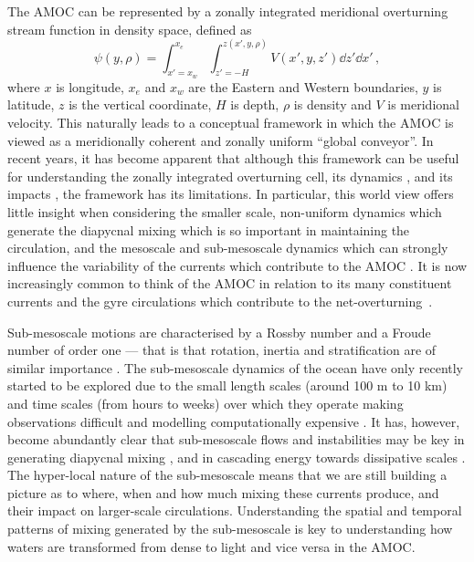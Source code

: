 The AMOC can be represented by a zonally integrated meridional overturning stream function in density space, defined as
\begin{equation}
    \psi(y, \rho) = \int_{x' = x_w}^{x_e} \int_{z' = -H}^{z(x', y, \rho)} V(x', y, z') \dd{z'} \dd{x'} \, ,
\end{equation}
where $x$ is longitude, $x_e$ and $x_w$ are the Eastern and Western boundaries, $y$ is latitude, $z$ is the vertical coordinate, $H$ is depth, $\rho$ is density and $V$ is meridional velocity. This naturally leads to a conceptual framework in which the AMOC is viewed as a meridionally coherent and zonally uniform ``global conveyor''. In recent years, it has become apparent that although this framework can be useful for understanding the zonally integrated overturning cell, its dynamics \citep{Weijer2019}, and its impacts \citep{Zhang2019, Little2019}, the framework has its limitations. In particular, this world view offers little insight when considering the smaller scale, non-uniform dynamics which generate the diapycnal mixing which is so important in maintaining the circulation, and the mesoscale and sub-mesoscale dynamics which can strongly influence the variability of the currents which contribute to the AMOC \citep[e.g.][]{Thomas2013}. It is now increasingly common to think of the AMOC in relation to its many constituent currents and the gyre circulations which contribute to the net-overturning~\citep{Bower2019}.

Sub-mesoscale motions are characterised by a Rossby number and a Froude number of order one --- that is that rotation, inertia and stratification are of similar importance \citep{Gula2022, McWilliams2016, Thomas2008}. The sub-mesoscale dynamics of the ocean have only recently started to be explored due to the small length scales (around 100 m to 10 km) and time scales (from hours to weeks) over which they operate making observations difficult and modelling computationally expensive \citep{Thomas2008}. It has, however, become abundantly clear that sub-mesoscale flows and instabilities may be key in generating diapycnal mixing \citep{Gula2022}, and in cascading energy towards dissipative scales \citep{Muller2005, Callies2013}. The hyper-local nature of the sub-mesoscale means that we are still building a picture as to where, when and how much mixing these currents produce, and their impact on larger-scale circulations. Understanding the spatial and temporal patterns of mixing generated by the sub-mesoscale is key to understanding how waters are transformed from dense to light and vice versa in the AMOC.

